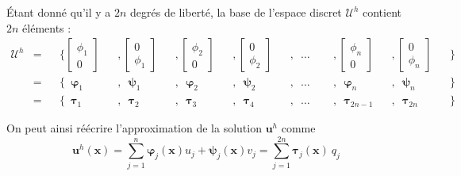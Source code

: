 \documentclass[12pt]{article}
\newcommand{\uu}{\mathbf{u}}
\newcommand{\xx}{\mathbf{x}}
\newcommand{\shapeu}{\boldsymbol{\varphi}}
\newcommand{\shapev}{\boldsymbol{\psi}}
\newcommand{\shapef}{\boldsymbol{\tau}}
\begin{document}
Étant donné qu'il y a $2n$ degrés de liberté, la base de l'espace discret
$\mathcal{U}^h$ contient $2n$ éléments :
\begin{equation}
    \begin{alignedat}{9}
    \mathcal{U}^h &=
    &&\Bigg\{
        \begin{bmatrix}
            \phi_1\\
            0
        \end{bmatrix}
        &&,
        \begin{bmatrix}
            0\\
            \phi_1
        \end{bmatrix}
        &&,
        \begin{bmatrix}
            \phi_2\\
            0
        \end{bmatrix}
        &&,
        \begin{bmatrix}
            0\\
            \phi_2
        \end{bmatrix}
        &&,
        \;\: \ldots\;\:
        &&,
        \begin{bmatrix}
            \phi_n\\
            0
        \end{bmatrix}
        &&,
        \begin{bmatrix}
            0\\
            \phi_n
        \end{bmatrix}
    &&\Bigg\}\\ 
    &=
    &&\Big\{
        \;\: \shapeu_{1} &&,
        \;\: \shapev_{1} &&,
        \;\: \shapeu_{2} &&,
        \;\: \shapev_{2} &&,
        \;\: \ldots \;\: &&,
        \;\: \shapeu_{n} &&,
        \;\: \shapev_{n}
    &&\Big\}\\ 
    &=
    &&\Big\{
        \;\: \shapef_{1}&&,
        \;\: \shapef_{2}&&,
        \;\: \shapef_{3}&&,
        \;\: \shapef_{4}&&,
        \;\: \ldots \;\: &&,
        \;\: \shapef_{2n-1}&&,
        \;\: \shapef_{2n}
    &&\Big\}
    \end{alignedat}
\end{equation}

On peut ainsi réécrire l'approximation de la solution $\uu^h$ comme
\begin{equation}
    \uu^h(\xx)
    = \sum_{j=1}^{n} \shapeu_{j}(\xx) u_j + \shapev_{j}(\xx) v_j    
    = \sum_{j=1}^{2n} \shapef_j(\xx) \: q_j
\end{equation}
\end{document}
